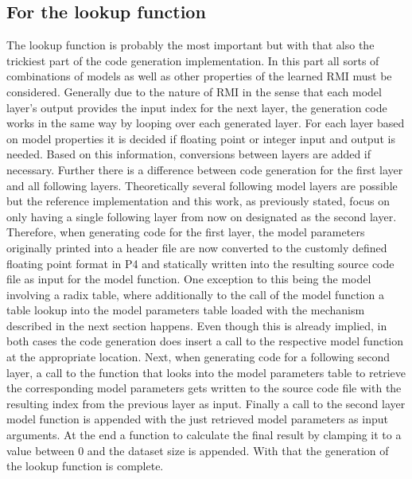 \subsection{For the lookup function}
\label{sect:rmiforp4:lookup}
The lookup function is probably the most important but with that also the trickiest part of the code generation implementation. In this part all sorts of combinations of models as well as other properties of the learned RMI must be considered. Generally due to the nature of RMI in the sense that each model layer's output provides the input index for the next layer, the generation code works in the same way by looping over each generated layer. For each layer based on model properties it is decided if floating point or integer input and output is needed. Based on this information, conversions between layers are added if necessary. Further there is a difference between code generation for the first layer and all following layers. Theoretically several following model layers are possible but the reference implementation and this work, as previously stated, focus on only having a single following layer from now on designated as the second layer. Therefore, when generating code for the first layer, the model parameters originally printed into a header file are now converted to the customly defined floating point format in P4 and statically written into the resulting source code file as input for the model function. One exception to this being the model involving a radix table, where additionally to the call of the model function a table lookup into the model parameters table loaded with the mechanism described in the next section happens. Even though this is already implied, in both cases the code generation does insert a call to the respective model function at the appropriate location. Next, when generating code for a following second layer, a call to the function that looks into the model parameters table to retrieve the corresponding model parameters gets written to the source code file with the resulting index from the previous layer as input. Finally a call to the second layer model function is appended with the just retrieved model parameters as input arguments. At the end a function to calculate the final result by clamping it to a value between 0 and the dataset size is appended. With that the generation of the lookup function is complete.

